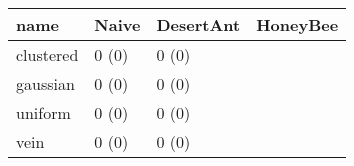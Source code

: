 \begin{tabular} {|l|l|l|l|}
\hline
name & Naive & DesertAnt & HoneyBee \\
\hline
clustered & 0 (0)  & 0 (0)  &  \\
gaussian & 0 (0)  & 0 (0)  &  \\
uniform & 0 (0)  & 0 (0)  &  \\
vein & 0 (0)  & 0 (0)  &  \\
\hline
\end{tabular}
